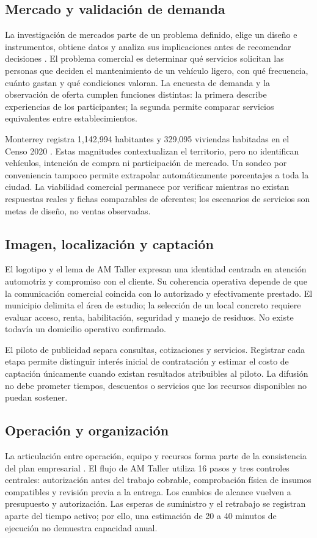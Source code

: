 {\subsection{Mercado y validación de demanda}
La investigación de mercados parte de un problema definido, elige un diseño e instrumentos, obtiene datos y analiza sus implicaciones antes de recomendar decisiones \citep{albrechtMarketing2023}. El problema comercial es determinar qué servicios solicitan las personas que deciden el mantenimiento de un vehículo ligero, con qué frecuencia, cuánto gastan y qué condiciones valoran. La encuesta de demanda y la observación de oferta cumplen funciones distintas: la primera describe experiencias de los participantes; la segunda permite comparar servicios equivalentes entre establecimientos.

Monterrey registra 1,142,994 habitantes y 329,095 viviendas habitadas en el Censo 2020 \citep{inegiMonterreyCenso2020}. Estas magnitudes contextualizan el territorio, pero no identifican vehículos, intención de compra ni participación de mercado. Un sondeo por conveniencia tampoco permite extrapolar automáticamente porcentajes a toda la ciudad. La viabilidad comercial permanece por verificar mientras no existan respuestas reales y fichas comparables de oferentes; los escenarios de servicios son metas de diseño, no ventas observadas.

\subsection{Imagen, localización y captación}
El logotipo y el lema de AM Taller expresan una identidad centrada en atención automotriz y compromiso con el cliente. Su coherencia operativa depende de que la comunicación comercial coincida con lo autorizado y efectivamente prestado. El municipio delimita el área de estudio; la selección de un local concreto requiere evaluar acceso, renta, habilitación, seguridad y manejo de residuos. No existe todavía un domicilio operativo confirmado.

El piloto de publicidad separa consultas, cotizaciones y servicios. Registrar cada etapa permite distinguir interés inicial de contratación y estimar el costo de captación únicamente cuando existan resultados atribuibles al piloto. La difusión no debe prometer tiempos, descuentos o servicios que los recursos disponibles no puedan sostener.

\subsection{Operación y organización}
La articulación entre operación, equipo y recursos forma parte de la consistencia del plan empresarial \citep{openstaxPlanIntegrador}. El flujo de AM Taller utiliza 16 pasos y tres controles centrales: autorización antes del trabajo cobrable, comprobación física de insumos compatibles y revisión previa a la entrega. Los cambios de alcance vuelven a presupuesto y autorización. Las esperas de suministro y el retrabajo se registran aparte del tiempo activo; por ello, una estimación de 20 a 40 minutos de ejecución no demuestra capacidad anual.

}
